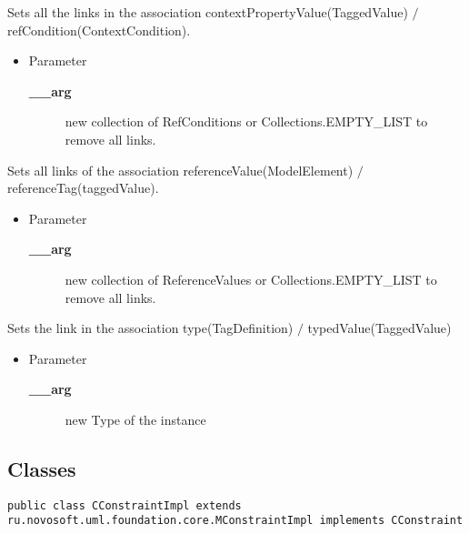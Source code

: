 \begin{desc}Sets all the links in the association contextPropertyValue(TaggedValue)
 $/$ refCondition(ContextCondition).
\begin{itemize}
\item{Parameter
  \begin{description}
   \item[{\bf \_\_arg}]{new collection of RefConditions or Collections.EMPTY\_LIST to
        remove all links.}
  \end{description}}
\end{itemize}
\end{desc}

\begin{desc}Sets all links of the association referenceValue(ModelElement)
 $/$ referenceTag(taggedValue).
\begin{itemize}
\item{Parameter
  \begin{description}
   \item[{\bf \_\_arg}]{new collection of ReferenceValues or Collections.EMPTY\_LIST to
        remove all links.}
  \end{description}}
\end{itemize}
\end{desc}

\begin{desc}Sets the link in the association type(TagDefinition)
 $/$ typedValue(TaggedValue)
\begin{itemize}
\item{Parameter
  \begin{description}
   \item[{\bf \_\_arg}]{new Type of the instance}
  \end{description}}
\end{itemize}
\end{desc}

\subsection{Classes}

{\tt public
 class CConstraintImpl extends ru.novosoft.uml.foundation.core.MConstraintImpl implements CConstraint}


